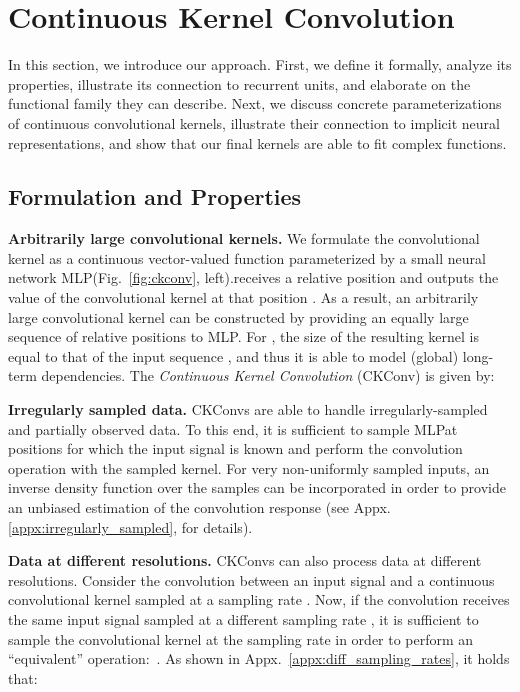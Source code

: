 \documentclass{article}
\newcommand{\mlp}{{\btt MLP}}
\begin{document}
\section{Continuous Kernel Convolution}\label{sec:continuous_kernel_conv}
\vspace{-2mm}
In this section, we introduce our approach. First, we define it formally, analyze its properties, illustrate its connection to recurrent units, and elaborate on the functional family they can describe. Next, we discuss concrete parameterizations of continuous convolutional kernels, illustrate their connection to implicit neural representations, and show that our final kernels are able to fit complex functions.
\vspace{-2mm}
\subsection{Formulation and Properties}\label{sec:overview}
\vspace{-2mm}
\textbf{Arbitrarily large convolutional kernels.} We formulate the convolutional kernel  as a continuous vector-valued function parameterized by a small neural network \mlp (Fig.~\ref{fig:ckconv}, left).\break \mlp receives a relative position  and outputs the value of the convolutional kernel at that position . As a result, an arbitrarily large convolutional kernel  can be constructed by providing an equally large sequence of relative positions  to \mlp.
For , the size of the resulting kernel is equal to that of the input sequence , and thus it is able to model (global) long-term dependencies.
The \textit{Continuous Kernel Convolution} (CKConv) is given by:

\textbf{Irregularly sampled data.} CKConvs are able to handle irregularly-sampled and partially observed data. To this end, it is sufficient to sample \mlp at positions for which the input signal is known and perform the convolution operation with the sampled kernel. For very non-uniformly sampled inputs, an inverse density function over the samples can be incorporated in order to provide an unbiased estimation of the convolution response (see Appx. \ref{appx:irregularly_sampled}, \citet{wu2019pointconv} for details). 


\textbf{Data at different resolutions.} CKConvs can also process data at different resolutions. Consider the convolution  between an input signal  and a continuous convolutional kernel  sampled at a sampling rate . Now, if the convolution receives the same input signal sampled at a different sampling rate , it is sufficient to sample the convolutional kernel at the sampling rate  in order to perform an \enquote{equivalent} operation:~. As shown in Appx.~\ref{appx:diff_sampling_rates}, it holds that:
\end{document}
